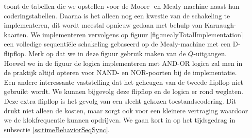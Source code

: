 \begin{table}[hbt]
\centering
{}
\caption{Uitgangslogica van de Moore- en Mealy-machine naast hun coderingstabellen.}
\end{table}
toont de tabellen die we opstellen voor de Moore- en Mealy-machine naast hun coderingstabellen. Daarna is het alleen nog een kwestie van de schakeling te implementeren, dit wordt meestal opnieuw gedaan met behulp van Karnaugh-kaarten. We implementeren vervolgens op figuur \ref{fig:mealyTotalImplementation} een volledige sequenti\"ele schakeling gebaseerd op de Mealy-machine met een D-flipflop. Merk op dat we in deze figuur gebruik maken van de $\overline{Q}$-uitgangen. Hoewel we in de figuur de logica implementeren met AND-OR logica zal men in de praktijk altijd opteren voor NAND- en NOR-poorten bij de implementatie. Een andere interessante vaststelling dat het geheugen van de tweede flipflop niet gebruikt wordt. We kunnen bijgevolg deze flipflop en de logica er rond weglaten. Deze extra flipflop is het gevolg van een slecht gekozen toestandscodering. Dit drukt niet alleen de kosten, maar zorgt ook voor een kleinere vertraging waardoor we de klokfrequentie kunnen opdrijven. We gaan kort in op het tijdsgedrag in subsectie \ref{ss:timeBehaviorSeqSync}.
